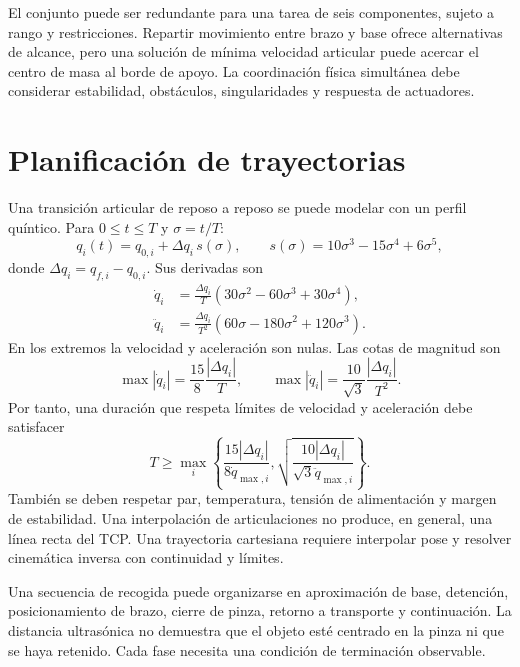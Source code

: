 El conjunto puede ser redundante para una tarea de seis componentes, sujeto a rango y restricciones. Repartir movimiento entre brazo y base ofrece alternativas de alcance, pero una solución de mínima velocidad articular puede acercar el centro de masa al borde de apoyo. La coordinación física simultánea debe considerar estabilidad, obstáculos, singularidades y respuesta de actuadores.

\section{Planificación de trayectorias}
Una transición articular de reposo a reposo se puede modelar con un perfil quíntico. Para $0\le t\le T$ y $\sigma=t/T$:
\begin{equation}
q_i(t)=q_{0,i}+\Delta q_i\,s(\sigma),
\qquad s(\sigma)=10\sigma^3-15\sigma^4+6\sigma^5,
\end{equation}
donde $\Delta q_i=q_{f,i}-q_{0,i}$. Sus derivadas son
\begin{align}
\dot q_i&=\frac{\Delta q_i}{T}\left(30\sigma^2-60\sigma^3+30\sigma^4\right),\\
\ddot q_i&=\frac{\Delta q_i}{T^2}\left(60\sigma-180\sigma^2+120\sigma^3\right).
\end{align}
En los extremos la velocidad y aceleración son nulas. Las cotas de magnitud son
\begin{equation}
\max|\dot q_i|=\frac{15}{8}\frac{|\Delta q_i|}{T},
\qquad
\max|\ddot q_i|=\frac{10}{\sqrt3}\frac{|\Delta q_i|}{T^2}.
\end{equation}
Por tanto, una duración que respeta límites de velocidad y aceleración debe satisfacer
\begin{equation}
T\ge\max_i\left\{
\frac{15|\Delta q_i|}{8\dot q_{\max,i}},
\sqrt{\frac{10|\Delta q_i|}{\sqrt3\ddot q_{\max,i}}}
\right\}.
\end{equation}
También se deben respetar par, temperatura, tensión de alimentación y margen de estabilidad. Una interpolación de articulaciones no produce, en general, una línea recta del TCP. Una trayectoria cartesiana requiere interpolar pose y resolver cinemática inversa con continuidad y límites.

Una secuencia de recogida puede organizarse en aproximación de base, detención, posicionamiento de brazo, cierre de pinza, retorno a transporte y continuación. La distancia ultrasónica no demuestra que el objeto esté centrado en la pinza ni que se haya retenido. Cada fase necesita una condición de terminación observable.

